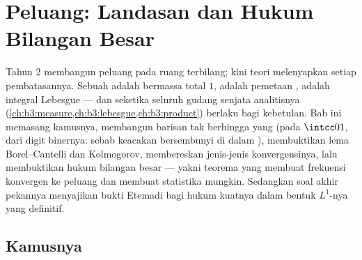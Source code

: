 \chapter{Peluang: Landasan dan Hukum Bilangan
Besar}\label{ch:b3:probability}

Tahun 2 membangun peluang pada ruang terbilang; kini teori 
melenyapkan setiap pembatasannya. Sebuah  adalah
 bermassa total $1$,  adalah
pemetaan ,  adalah integral Lebesgue --- dan
seketika seluruh gudang senjata analitisnya
(\cref{ch:b3:measure,ch:b3:lebesgue,ch:b3:product}) berlaku bagi
kebetulan. Bab ini memasang kamusnya, membangun
barisan tak berhingga  yang  (pada
$\intcc01$, dari digit binernya: sebab keacakan bersembunyi di dalam
), membuktikan lema Borel--Cantelli dan
 Kolmogorov, membereskan jenis-jenis
konvergensinya, lalu membuktikan hukum bilangan besar --- yakni
teorema yang membuat frekuensi konvergen ke peluang dan
membuat statistika mungkin. Sedangkan soal akhir pekannya menyajikan bukti
Etemadi bagi hukum kuatnya dalam bentuk $L^1$-nya yang definitif.

\section{Kamusnya}


